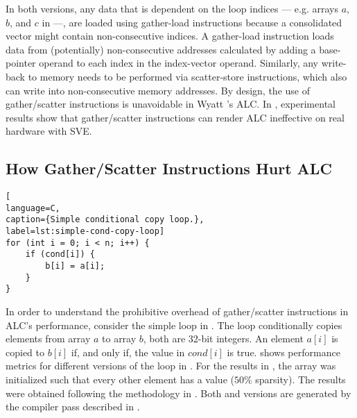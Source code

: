 In both versions, any data that is dependent on the loop indices --- e.g. arrays $a$, $b$, and $c$ in  ---, are loaded using gather-load instructions because a consolidated vector might contain non-consecutive indices.
A gather-load instruction loads data from (potentially) non-consecutive addresses calculated by adding a base-pointer operand to each index in the index-vector operand.
Similarly, any write-back to memory needs to be performed via scatter-store instructions, which also can write into non-consecutive memory addresses.
By design, the use of gather/scatter instructions is unavoidable in Wyatt \etal's ALC.
In , experimental results show that gather/scatter instructions can render ALC ineffective on real hardware with SVE.

\subsection{How Gather/Scatter Instructions Hurt ALC}
\label{sec:gathers-scatters-are-bad}

\begin{center}
\begin{minipage}[t]{0.8\linewidth}
\begin{lstlisting}[
language=C,
caption={Simple conditional copy loop.},
label=lst:simple-cond-copy-loop]
for (int i = 0; i < n; i++) {
    if (cond[i]) {
        b[i] = a[i];
    }
}
\end{lstlisting} 
\end{minipage}
\end{center}

In order to understand the prohibitive overhead of gather/scatter instructions in ALC's performance, consider the simple loop in .
The loop conditionally copies elements from array $a$ to array $b$, both are 32-bit integers.
An element $a[i]$ is copied to $b[i]$  if, and only if, the value in $cond[i]$ is true.
 shows performance metrics for different versions of the loop in .
For the results in , the  array was initialized such that every other element has a  value ($50\%$ sparsity).
The results were obtained following the methodology in .
Both \ALC and \ALCdp versions are generated by the compiler pass described in .

